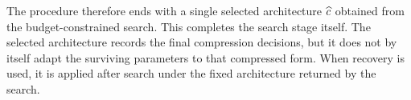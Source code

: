 The procedure therefore ends with a single selected architecture $\widehat{c}$ obtained from the budget-constrained search. This completes the search stage itself. The selected architecture records the final compression decisions, but it does not by itself adapt the surviving parameters to that compressed form. When recovery is used, it is applied after search under the fixed architecture returned by the search.
